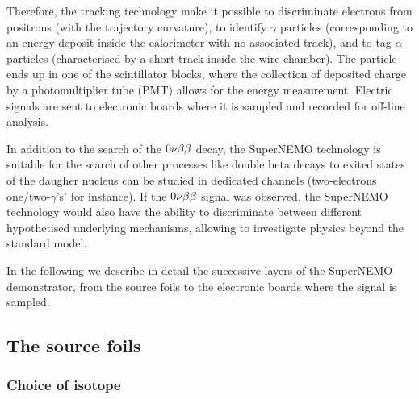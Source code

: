 Therefore, the tracking technology make it possible to discriminate electrons from positrons (with the trajectory curvature), to identify $\gamma$ particles (corresponding to an energy deposit inside the calorimeter with no associated track), and to tag $\alpha$ particles (characterised by a short track inside the wire chamber).
The particle ends up in one of the scintillator blocks, where the collection of deposited charge by a photomultiplier tube (PMT) allows for the energy measurement.
Electric signals are sent to electronic boards where it is sampled and recorded for off-line analysis.

In addition to the search of the $0\nu\beta\beta$ decay, the SuperNEMO technology is suitable for the search of other processes like double beta decays to exited states of the daugher nucleus can be studied in dedicated channels (two-electrons one/two-$\gamma$'s' for instance).
If the $0\nu\beta\beta$ signal was observed, the SuperNEMO technology would also have the ability to discriminate between different hypothetised underlying mechanisms, allowing to investigate physics beyond the standard model.

In the following we describe in detail the successive layers of the SuperNEMO demonstrator, from the source foils to the electronic boards where the signal is sampled.


\subsection{The source foils}

\subsubsection*{Choice of isotope}

